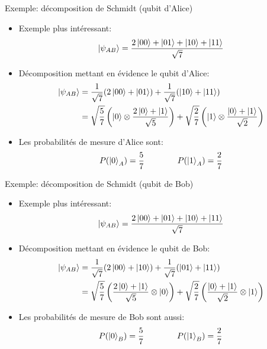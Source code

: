 \documentclass[aspectratio=169,12pt]{beamer}
\begin{document}
\begin{frame}{Exemple: décomposition de Schmidt (qubit d'Alice)}
  \begin{itemize}[<+->]
    \item Exemple plus intéressant:
    \begin{equation*}
      \ket{\psi_{AB}} = \frac{2\ket{00} + \ket{01} + \ket{10} + \ket{11}}{\sqrt{7}}
    \end{equation*}
    \item Décomposition mettant en évidence le qubit d'Alice:
    \begin{align*}
      \ket{\psi_{AB}} 
      &= \frac{1}{\sqrt{7}} (2\ket{00} + \ket{01}) + \frac{1}{\sqrt{7}} (\ket{10} + \ket{11})\\
      &= \sqrt{\frac{5}{7}} \left( \ket{0} \otimes \frac{2\ket{0}+\ket{1}}{\sqrt{5}} \right) + \sqrt{\frac{2}{7}} \left( \ket{1} \otimes \frac{\ket{0}+\ket{1}}{\sqrt{2}} \right)
    \end{align*}
    \item Les probabilités de mesure d'Alice sont:
    \begin{equation*}
      P(\ket{0}_A) = \frac{5}{7} \qquad\qquad P(\ket{1}_A) = \frac{2}{7}
    \end{equation*}
  \end{itemize}
\end{frame}

\begin{frame}{Exemple: décomposition de Schmidt (qubit de Bob)}
  \begin{itemize}
    \item Exemple plus intéressant:
    \begin{equation*}
      \ket{\psi_{AB}} = \frac{2\ket{00} + \ket{01} + \ket{10} + \ket{11}}{\sqrt{7}}
    \end{equation*}
    \item Décomposition mettant en évidence le qubit de Bob:
    \begin{align*}
      \ket{\psi_{AB}} 
      &= \frac{1}{\sqrt{7}} (2\ket{00} + \ket{10}) + \frac{1}{\sqrt{7}} (\ket{01} + \ket{11})\\
      &= \sqrt{\frac{5}{7}} \left( \frac{2\ket{0}+\ket{1}}{\sqrt{5}} \otimes \ket{0} \right) + \sqrt{\frac{2}{7}} \left( \frac{\ket{0}+\ket{1}}{\sqrt{2}} \otimes \ket{1} \right)
    \end{align*}
    \item Les probabilités de mesure de Bob sont aussi:
    \begin{equation*}
      P(\ket{0}_B) = \frac{5}{7} \qquad\qquad P(\ket{1}_B) = \frac{2}{7}
    \end{equation*}
  \end{itemize}
\end{frame}
\end{document}
